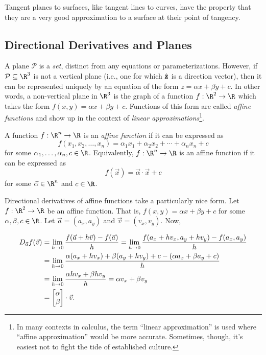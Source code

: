 Tangent planes to surfaces, like tangent lines to curves, have
the property that they are a very good approximation to a surface
at their point of tangency. 

\subsection{Directional Derivatives and Planes}

A plane $\mathcal P$ is a \emph{set}, distinct from any equations
or parameterizations.  However, if $\mathcal P\subseteq \R^3$ is not a vertical
plane (i.e., one for which ${\hat {\mathbf z}}$ is a direction vector), then it can be represented
uniquely by an equation of the form $z=\alpha x+\beta y+c$.  In other words,
a non-vertical plane in $\R^3$ is the graph of a function $f:\R^2\to\R$
which takes the form $f(x,y)=\alpha x+\beta y+c$.  Functions of this form
are called \emph{affine functions} and 
show up in the context of \emph{linear approximations}\footnote{
	In many contexts in calculus, the term ``linear approximation'' is used
	where ``affine approximation'' would be more accurate.  Sometimes, though,
	it's easiest not to fight the tide of established culture.}.
\label{SECAFFINE}
\begin{definition}
	A function $f:\R^n\to\R$ is an \emph{affine function} if it can
	be expressed as
	\[
		f(x_1,x_2,\ldots,x_n) = \alpha_1x_1+\alpha_2x_2+\cdots+\alpha_nx_n +c
	\]
	for some $\alpha_1,\ldots,\alpha_n,c\in\R$.  Equivalently, $f:\R^n\to\R$ is
	an affine function if it can be expressed as
	\[
		f(\vec x)=\vec \alpha \cdot \vec x+c
	\]
	for some $\vec\alpha\in\R^n$ and $c\in \R$.
\end{definition}


Directional derivatives of affine functions take a particularly nice form.
Let $f:\R^2\to\R$ be an affine function.
That is, $f(x,y)=\alpha x+\beta y+c$ for some $\alpha,\beta,c\in\R$. 
Let $\vec a=(a_x,a_y)$ and $\vec v=(v_x,v_y)$.  Now,

\begin{align*}
	D_{\vec a}f(\vec v) &= \lim_{h\to0}\frac{f(\vec a+h\vec v)-f(\vec a)}{h}
	=\lim_{h\to0}\frac{f(a_x+hv_x, a_y+hv_y)-f(a_x,a_y)}{h}\\
	&=\lim_{h\to0}\frac{\alpha(a_x+hv_x)+\beta( a_y+hv_y)+c-(\alpha a_x+\beta a_y+c)}{h}\\
	&=\lim_{h\to0}\frac{\alpha hv_x+\beta hv_y}{h} = \alpha v_x+\beta v_y\\
	&=\mat{\alpha\\\beta}\cdot \vec v.
\end{align*}


